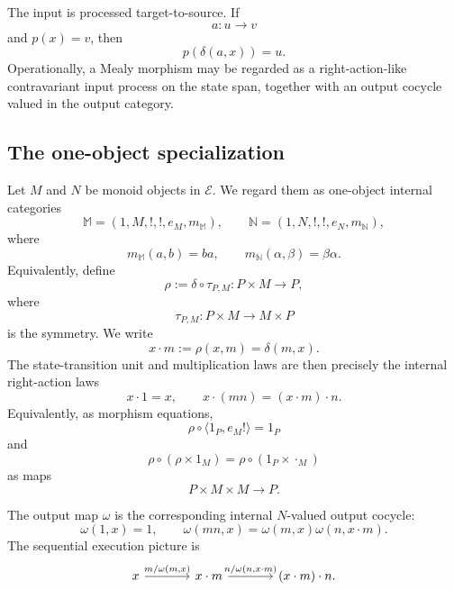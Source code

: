 \begin{remark}
\label{rem:contravariant-input-processing}
    The input is processed target-to-source. If
    \[
        a:u\to v
    \]
    and \(p(x)=v\), then
    \[
        p(\delta(a,x))=u.
    \]
    Operationally, a Mealy morphism may be regarded as a right-action-like contravariant input process on the state span, together with an output cocycle valued in the output category.
\end{remark}

\subsection{The one-object specialization}
\label{subsec:one-object-mealy-morphisms}

Let \(M\) and \(N\) be monoid objects in \(\mathcal E\). We regard them as one-object internal categories
\[
    \mathbb M=(1,M,!,!,e_M,m_{\mathbb M}),
    \qquad
    \mathbb N=(1,N,!,!,e_N,m_{\mathbb N}),
\]
where
\[
    m_{\mathbb M}(a,b)=ba,
    \qquad
    m_{\mathbb N}(\alpha,\beta)=\beta\alpha.
\]
Equivalently, define
\[
    \rho
    :=
    \delta\circ\tau_{P,M}
    :
    P\times M\to P,
\]
where
\[
    \tau_{P,M}:P\times M\to M\times P
\]
is the symmetry. We write
\[
    x\cdot m
    :=
    \rho(x,m)
    =
    \delta(m,x).
\]
The state-transition unit and multiplication laws are then precisely the
internal right-action laws
\[
    x\cdot 1=x,
    \qquad
    x\cdot(mn)=(x\cdot m)\cdot n.
\]
Equivalently, as morphism equations,
\[
    \rho\circ\langle 1_P,e_M!\rangle
    =
    1_P
\]
and
\[
    \rho\circ(\rho\times 1_M)
    =
    \rho\circ(1_P\times\cdot_M)
\]
as maps
\[
    P\times M\times M\to P.
\]

The output map \(\omega\) is the corresponding internal \(N\)-valued output
cocycle:
\[
    \omega(1,x)=1,
    \qquad
    \omega(mn,x)=\omega(m,x)\omega(n,x\cdot m).
\]
The sequential execution picture is
\[
    \begin{tikzcd}[column sep=large]
            x
                \arrow[r, "{m/\omega(m,x)}"]
        &
            x\cdot m
                \arrow[r, "{n/\omega(n,x\cdot m)}"]
        &
            (x\cdot m)\cdot n.
    \end{tikzcd}
\]

